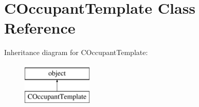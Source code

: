 \hypertarget{class_c_occupant_template_1_1_c_occupant_template}{}\section{C\+Occupant\+Template Class Reference}
\label{class_c_occupant_template_1_1_c_occupant_template}
Inheritance diagram for C\+Occupant\+Template\+:\begin{figure}[H]
\begin{center}
\leavevmode
\includegraphics[height=2.000000cm]{class_c_occupant_template_1_1_c_occupant_template}
\end{center}
\end{figure}
